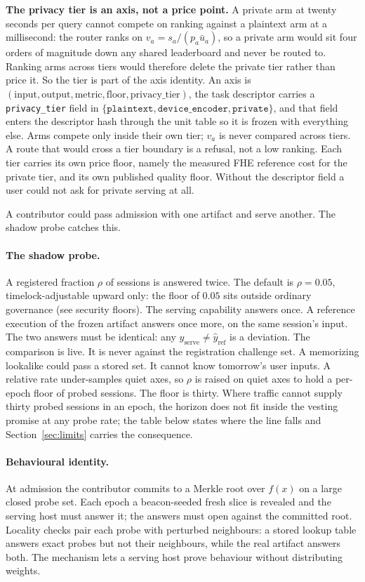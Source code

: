 \documentclass[11pt]{article}
\begin{document}
\textbf{The privacy tier is an axis, not a price point.} A private
arm at twenty seconds per query cannot compete on ranking against a
plaintext arm at a millisecond: the router ranks on
$v_a = s_a/(p_a \bar u_a)$, so a private arm would sit four orders
of magnitude down any shared leaderboard and never be routed to.
Ranking arms across tiers would therefore delete the private tier
rather than price it. So the tier is part of the axis identity.
An axis is $(\text{input}, \text{output}, \text{metric},
    \text{floor}, \text{privacy\_tier})$, the task descriptor carries
a \texttt{privacy\_tier} field in
$\{\texttt{plaintext}, \texttt{device\_encoder},
    \texttt{private}\}$, and that field enters the descriptor hash
through the unit table so it is frozen with everything else. Arms
compete only inside their own tier; $v_a$ is never compared across
tiers. A route that would cross a tier boundary is a refusal, not
a low ranking. Each tier carries its own price floor, namely the
measured FHE reference cost for the private tier, and its own
published quality floor. Without the descriptor field a user
could not ask for private serving at all.

A contributor could pass admission with one artifact and serve
another. The shadow probe catches this.

\paragraph{The shadow probe.} A registered fraction $\rho$ of sessions
is answered twice. The default is $\rho=0.05$, timelock-adjustable
upward only: the floor of $0.05$ sits outside ordinary governance
(see security floors).
The serving capability answers once. A reference execution of the
frozen artifact answers once more, on the same session's input.
The two answers must be identical: any
$\hat y_{\mathrm{serve}} \neq \hat y_{\mathrm{ref}}$ is a
deviation. The comparison is live. It is
never against the registration challenge set. A memorizing
lookalike could pass a stored set. It cannot know tomorrow's user
inputs. A relative rate under-samples quiet axes, so $\rho$ is
raised on quiet axes to hold a per-epoch floor of probed sessions.
The floor is thirty. Where traffic cannot supply thirty probed
sessions in an epoch, the horizon does not fit inside the vesting
promise at any probe rate; the table below states where the line
falls and Section~\ref{sec:limits} carries the consequence.

\paragraph{Behavioural identity.} At admission the
contributor commits to a Merkle root over $f(x)$ on a large
closed probe set. Each epoch a beacon-seeded fresh slice is
revealed and the serving host must answer it; the answers must
open against the committed root. Locality checks pair each probe
with perturbed neighbours: a stored lookup table answers exact
probes but not their neighbours, while the real artifact answers
both. The mechanism lets a serving host prove behaviour without
distributing weights.
\end{document}
